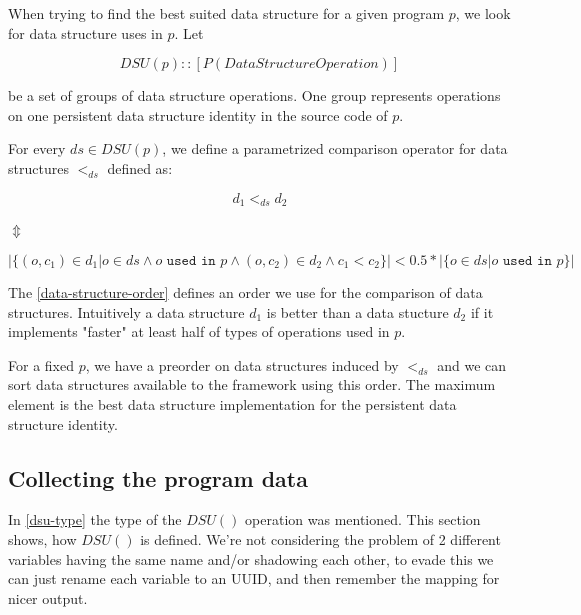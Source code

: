 \documentclass[a4paper,11pt]{article}
\begin{document}
		When trying to find the best suited data structure for a given program $p$, we look for data structure
		uses in $p$. Let

		\begin{equation} \label{dsu-type}
			DSU(p) :: [P(DataStructureOperation)]
		\end{equation}

		be a set of groups of data structure operations. One group represents operations on one persistent
        data structure identity in the source code of $p$.

		For every $ds \in DSU(p)$, we define a parametrized comparison operator for data structures $<_{ds}$
		defined as:

		\begin{center}

			\begin{equation}
				d_1 <_{ds} d_2
			\end{equation}

			$\Updownarrow$

			\begin{equation} \label{data-structure-order}
|\{(o, c_1) \in d_1 | o \in ds \wedge o \texttt{ used in $p$} \wedge (o,c_2) \in d_2 \wedge c_1 < c_2 \}| < 0.5 *
 |\{o \in ds | o \texttt{ used in $p$} \}|
			\end{equation}

		\end{center}

		The \autoref{data-structure-order} defines an order we use for the comparison of data
		structures. Intuitively a data structure $d_1$ is better than a data stucture $d_2$ if
		it implements "faster" at least half of types of operations used in $p$.

		For a fixed $p$, we have a preorder on data structures induced by $<_{ds}$ and we can sort data structures
		available to the framework using this order. The maximum element is the best data structure
		implementation for the persistent data structure identity.

	\subsection{Collecting the program data} \label{dsu-definition}

		In \autoref{dsu-type} the type of the $DSU()$ operation was mentioned. This section shows, how $DSU()$ is
		defined. We're not considering the problem of 2 different variables having the same name and/or shadowing each
        other, to evade this we can just rename each variable to an UUID, and then remember the mapping for nicer
        output.
\end{document}
